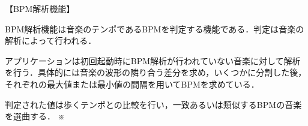 【BPM解析機能】
\par
BPM解析機能は音楽のテンポであるBPMを判定する機能である．判定は音楽の解析によって行われる．
\par アプリケーションは初回起動時にBPM解析が行われていない音楽に対して解析を行う．具体的には音楽の波形の隣り合う差分を求め，いくつかに分割した後，それぞれの最大値または最小値の間隔を用いてBPMを求めている．
\par 判定された値は歩くテンポとの比較を行い，一致あるいは類似するBPMの音楽を選曲する．
※
